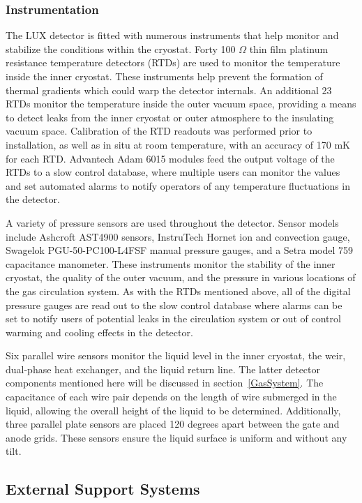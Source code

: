 \subsubsection{Instrumentation}

The LUX detector is fitted with numerous instruments that help monitor and stabilize the conditions within the cryostat. Forty 100 $\Omega$ thin film platinum resistance temperature detectors (RTDs) are used to monitor the temperature inside the inner cryostat. These instruments help prevent the formation of thermal gradients which could warp the detector internals.  An additional 23 RTDs monitor the temperature inside the outer vacuum space, providing a means to detect leaks from the inner cryostat or outer atmosphere to the insulating vacuum space. Calibration of the RTD readouts was performed prior to installation, as well as in situ at room temperature, with an accuracy of 170 mK for each RTD.  Advantech Adam 6015 modules feed the output voltage of the RTDs to a slow control database, where multiple users can monitor the values and set automated alarms to notify operators of any temperature fluctuations in the detector.  

A variety of pressure sensors are used throughout the detector.  Sensor models include Ashcroft AST4900 sensors, InstruTech Hornet ion and convection gauge, Swagelok PGU-50-PC100-L4FSF manual pressure gauges, and a Setra model 759 capacitance manometer.  These instruments monitor the stability of the inner cryostat, the quality of the outer vacuum, and the pressure in various locations of the gas circulation system.  As with the RTDs mentioned above, all of the digital pressure gauges are read out to the slow control database where alarms can be set to notify users of potential leaks in the circulation system or out of control warming and cooling effects in the detector.

Six parallel wire sensors monitor the liquid level in the inner cryostat, the weir, dual-phase heat exchanger, and the liquid return line.   The latter detector components mentioned here will be discussed in section~\ref{GasSystem}.  The capacitance of each wire pair depends on the length of wire submerged in the liquid, allowing the overall height of the liquid to be determined.  Additionally, three parallel plate sensors are placed 120 degrees apart between the gate and anode grids.  These sensors ensure the liquid surface is uniform and without any tilt.    


\subsection{External Support Systems}

